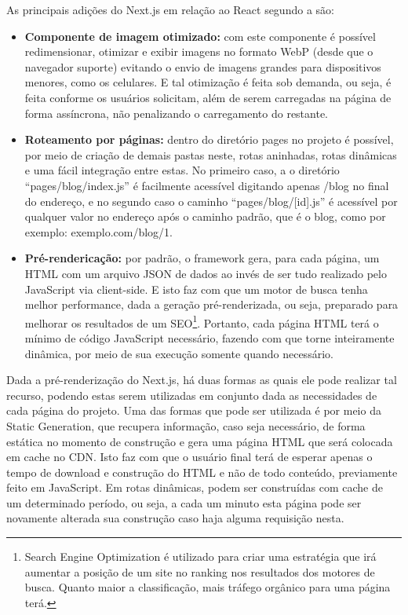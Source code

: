 As principais adições do Next.js em relação ao React segundo a  são:
\begin{itemize}
    \item \textbf{Componente de imagem otimizado:} com este componente é possível redimensionar, otimizar e exibir imagens no formato WebP (desde que o navegador suporte) evitando o envio de imagens grandes para dispositivos menores, como os celulares. E tal otimização é feita sob demanda, ou seja, é feita conforme os usuários solicitam, além de serem carregadas na página de forma assíncrona, não penalizando o carregamento do restante.
    \item \textbf{Roteamento por páginas:} dentro do diretório pages no projeto é possível, por meio de criação de demais pastas neste, rotas aninhadas, rotas dinâmicas e uma fácil integração entre estas. No primeiro caso, a o diretório “pages/blog/index.js” é facilmente acessível digitando apenas /blog no final do endereço, e no segundo caso o caminho “pages/blog/[id].js” é acessível por qualquer valor no endereço após o caminho padrão, que é o blog, como por exemplo: exemplo.com/blog/1.
    \item \textbf{Pré-rendericação:} por padrão, o framework gera, para cada página, um HTML com um arquivo JSON de dados ao invés de ser tudo realizado pelo JavaScript via client-side. E isto faz com que um motor de busca tenha melhor performance, dada a geração pré-renderizada, ou seja, preparado para melhorar os resultados de um SEO\footnote{Search Engine Optimization é utilizado para criar uma estratégia que irá aumentar a posição de um site no ranking nos resultados dos motores de busca. Quanto maior a classificação, mais tráfego orgânico para uma página terá.}. Portanto, cada página HTML terá o mínimo de código JavaScript necessário, fazendo com que torne inteiramente dinâmica, por meio de sua execução somente quando necessário.
\end{itemize}

Dada a pré-renderização do Next.js, há duas formas as quais ele pode realizar tal recurso, podendo estas serem utilizadas em conjunto dada as necessidades de cada página do projeto. Uma das formas que pode ser utilizada é por meio da Static Generation, que recupera informação, caso seja necessário, de forma estática no momento de construção e gera uma página HTML que será colocada em cache no CDN. Isto faz com que o usuário final terá de esperar apenas o tempo de download e construção do HTML e não de todo conteúdo, previamente feito em JavaScript. Em rotas dinâmicas, podem ser construídas com cache de um determinado período, ou seja, a cada um minuto esta página pode ser novamente alterada sua construção caso haja alguma requisição nesta.


